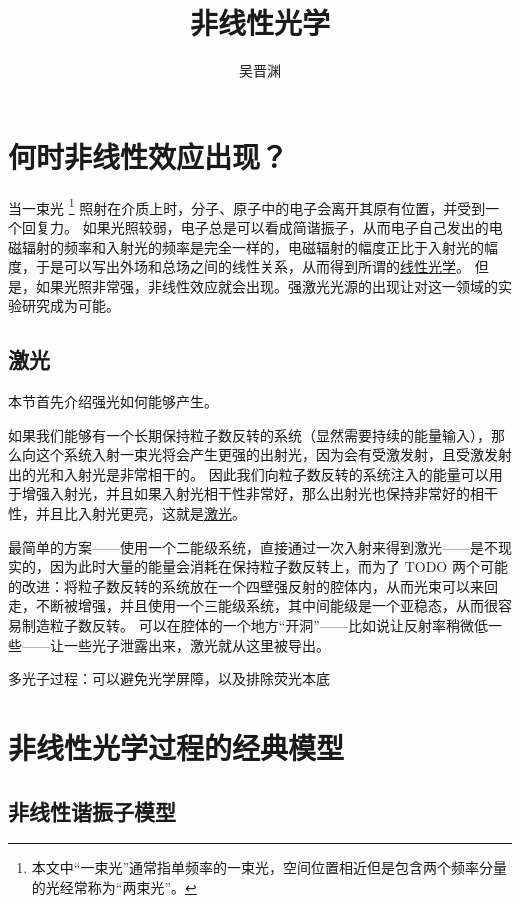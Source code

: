 \documentclass[UTF8, a4paper]{ctexart}
\title{非线性光学}
\author{吴晋渊}
\newcommand{\concept}[1]{\underline{#1}}
\begin{document}
\maketitle

\section{何时非线性效应出现？}

当一束光%
\footnote{
    本文中“一束光”通常指单频率的一束光，空间位置相近但是包含两个频率分量的光经常称为“两束光”。
}%
照射在介质上时，分子、原子中的电子会离开其原有位置，并受到一个回复力。
如果光照较弱，电子总是可以看成简谐振子，从而电子自己发出的电磁辐射的频率和入射光的频率是完全一样的，电磁辐射的幅度正比于入射光的幅度，于是可以写出外场和总场之间的线性关系，从而得到所谓的\concept{线性光学}。
但是，如果光照非常强，非线性效应就会出现。强激光光源的出现让对这一领域的实验研究成为可能。

\subsection{激光}

本节首先介绍强光如何能够产生。

如果我们能够有一个长期保持粒子数反转的系统（显然需要持续的能量输入），那么向这个系统入射一束光将会产生更强的出射光，因为会有受激发射，且受激发射出的光和入射光是非常相干的。
因此我们向粒子数反转的系统注入的能量可以用于增强入射光，并且如果入射光相干性非常好，那么出射光也保持非常好的相干性，并且比入射光更亮，这就是\concept{激光}。

最简单的方案——使用一个二能级系统，直接通过一次入射来得到激光——是不现实的，因为此时大量的能量会消耗在保持粒子数反转上，而为了 TODO
两个可能的改进：将粒子数反转的系统放在一个四壁强反射的腔体内，从而光束可以来回走，不断被增强，并且使用一个三能级系统，其中间能级是一个亚稳态，从而很容易制造粒子数反转。
可以在腔体的一个地方“开洞”——比如说让反射率稍微低一些——让一些光子泄露出来，激光就从这里被导出。

多光子过程：可以避免光学屏障，以及排除荧光本底

\section{非线性光学过程的经典模型}\label{sec:classical-models}

\subsection{非线性谐振子模型}\label{sec:classical-oscillator}
\end{document}
